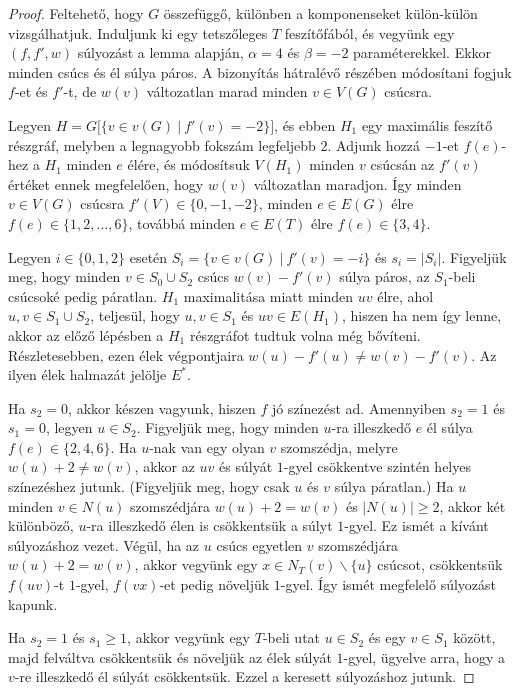 \documentclass[12pt, a4paper]{report}
\theoremstyle{remark}
\theoremstyle{definition}
\begin{document}
\begin{proof}
Feltehető, hogy $G$ összefüggő, különben a komponenseket külön-külön vizsgálhatjuk. Induljunk ki egy tetszőleges $T$ feszítőfából, és vegyünk egy $(f, f', w)$ súlyozást a lemma alapján, $\alpha = 4$ és $\beta = -2$ paraméterekkel. Ekkor minden csúcs és él súlya páros. A bizonyítás hátralévő részében módosítani fogjuk $f$-et és $f'$-t, de $w(v)$ változatlan marad minden $v \in V(G)$ csúcsra.

Legyen $H = G\lbrack \lbrace v \in v(G)\ |\ f'(v) = -2 \rbrace \rbrack$, és ebben $H_1$ egy maximális feszítő részgráf, melyben a legnagyobb fokszám legfeljebb $2$. Adjunk hozzá $-1$-et $f(e)$-hez a $H_1$ minden $e$ élére, és módosítsuk $V(H_1)$ minden $v$ csúcsán az $f'(v)$ értéket ennek megfelelően, hogy $w(v)$ változatlan maradjon. Így minden $v \in V(G)$ csúcsra $f'(V) \in \lbrace 0, -1, -2 \rbrace$, minden $e \in E(G)$ élre $f(e) \in \lbrace 1, 2, \ldots, 6 \rbrace$, továbbá minden $e \in E(T)$ élre $f(e) \in \lbrace 3, 4 \rbrace$.

Legyen $i \in \lbrace 0, 1, 2 \rbrace$ esetén $S_i = \lbrace v \in v(G)\ |\ f'(v) = -i \rbrace$ és $s_i = |S_i|$. Figyeljük meg, hogy minden $v \in S_0 \cup S_2$ csúcs $w(v) - f'(v)$ súlya páros, az $S_1$-beli csúcsoké pedig páratlan. $H_1$ maximalitása miatt minden $uv$ élre, ahol $u, v \in S_1 \cup S_2$, teljesül, hogy $u, v \in S_1$ és $uv \in E(H_1)$, hiszen ha nem így lenne, akkor az előző lépésben a $H_1$ részgráfot tudtuk volna még bővíteni. Részletesebben, ezen élek végpontjaira $w(u) - f'(u) \neq w(v) - f'(v)$. Az ilyen élek halmazát jelölje $E^*$.

Ha $s_2 = 0$, akkor készen vagyunk, hiszen $f$ jó színezést ad. Amennyiben $s_2 = 1$ és $s_1 = 0$, legyen $u \in S_2$. Figyeljük meg, hogy minden $u$-ra illeszkedő $e$ él súlya $f(e) \in \lbrace 2, 4, 6 \rbrace$. Ha $u$-nak van egy olyan $v$ szomszédja, melyre $w(u) + 2 \neq w(v)$, akkor az $uv$ és súlyát $1$-gyel csökkentve szintén helyes színezéshez jutunk. (Figyeljük meg, hogy csak $u$ és $v$ súlya páratlan.) Ha $u$ minden $v \in N(u)$ szomszédjára $w(u) + 2 = w(v)$ és $|N(u)| \geq 2$, akkor két különböző, $u$-ra illeszkedő élen is csökkentsük a súlyt $1$-gyel. Ez ismét a kívánt súlyozáshoz vezet. Végül, ha az $u$ csúcs egyetlen $v$ szomszédjára $w(u) + 2 = w(v)$, akkor vegyünk egy $x \in N_T(v) \smallsetminus \lbrace u \rbrace$ csúcsot, csökkentsük $f(uv)$-t $1$-gyel, $f(vx)$-et pedig növeljük $1$-gyel. Így ismét megfelelő súlyozást kapunk.

Ha $s_2 = 1$ és $s_1 \geq 1$, akkor vegyünk egy $T$-beli utat $u \in S_2$ és egy $v \in S_1$ között, majd felváltva csökkentsük és növeljük az élek súlyát $1$-gyel, ügyelve arra, hogy a $v$-re illeszkedő él súlyát csökkentsük. Ezzel a keresett súlyozáshoz jutunk.


\end{proof}
\end{document}
